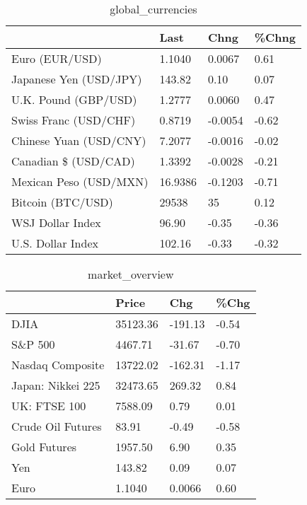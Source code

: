 \documentclass{article}%
\begin{document}
%


\begin{table}[htbp]%
\caption{global\_currencies}%
\centering%
\begin{adjustbox}{width=1\textwidth}%
\begin{tabular}{llll}
\toprule
                       &    Last &    Chng & \%Chng \\
\midrule
        Euro (EUR/USD) &  1.1040 &  0.0067 &  0.61 \\
Japanese Yen (USD/JPY) &  143.82 &    0.10 &  0.07 \\
  U.K. Pound (GBP/USD) &  1.2777 &  0.0060 &  0.47 \\
 Swiss Franc (USD/CHF) &  0.8719 & -0.0054 & -0.62 \\
Chinese Yuan (USD/CNY) &  7.2077 & -0.0016 & -0.02 \\
  Canadian \$ (USD/CAD) &  1.3392 & -0.0028 & -0.21 \\
Mexican Peso (USD/MXN) & 16.9386 & -0.1203 & -0.71 \\
     Bitcoin (BTC/USD) &   29538 &      35 &  0.12 \\
      WSJ Dollar Index &   96.90 &   -0.35 & -0.36 \\
     U.S. Dollar Index &  102.16 &   -0.33 & -0.32 \\
\bottomrule
\end{tabular}
%
\end{adjustbox}%
\end{table}

%


\begin{table}[htbp]%
\caption{market\_overview}%
\centering%
\begin{adjustbox}{width=1\textwidth}%
\begin{tabular}{llll}
\toprule
                  &    Price &     Chg &  \%Chg \\
\midrule
             DJIA & 35123.36 & -191.13 & -0.54 \\
          S\&P 500 &  4467.71 &  -31.67 & -0.70 \\
 Nasdaq Composite & 13722.02 & -162.31 & -1.17 \\
Japan: Nikkei 225 & 32473.65 &  269.32 &  0.84 \\
     UK: FTSE 100 &  7588.09 &    0.79 &  0.01 \\
Crude Oil Futures &    83.91 &   -0.49 & -0.58 \\
     Gold Futures &  1957.50 &    6.90 &  0.35 \\
              Yen &   143.82 &    0.09 &  0.07 \\
             Euro &   1.1040 &  0.0066 &  0.60 \\
\bottomrule
\end{tabular}
%
\end{adjustbox}%
\end{table}

%
\end{document}

